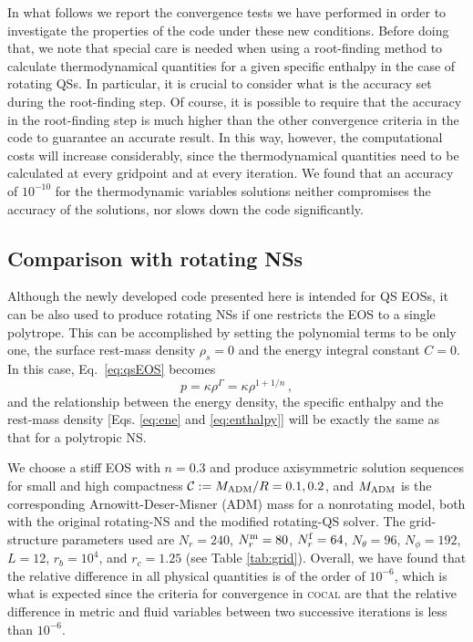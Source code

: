 \documentclass[twocolumn,superscriptaddress,showpacs,prd,aps,amsmath,amssymb,nofootinbib]{revtex4-1}
\newcommand{\cocal}{\textsc{cocal}}
\begin{document}
In what follows we report the convergence tests we have performed in
order to investigate the properties of the code under these new
conditions. Before doing that, we note that special care is needed when
using a root-finding method to calculate thermodynamical quantities for a
given specific enthalpy in the case of rotating QSs. In particular, it is
crucial to consider what is the accuracy set during the root-finding
step. Of course, it is possible to require that the accuracy in the
root-finding step is much higher than the other convergence criteria in
the code to guarantee an accurate result. In this way, however, the
computational costs will increase considerably, since the thermodynamical
quantities need to be calculated at every gridpoint and at every
iteration. We found that an accuracy of $10^{-10}$ for the thermodynamic
variables solutions neither compromises the accuracy of the solutions,
nor slows down the code significantly.



\subsection{Comparison with rotating NSs}

Although the newly developed code presented here is intended for QS EOSs,
it can be also used to produce rotating NSs if one restricts the EOS to a
single polytrope. This can be accomplished by setting the polynomial
terms to be only one, the surface rest-mass density $\rho_s=0$ and the
energy integral constant $C=0$. In this case,
Eq.~\eqref{eq:qsEOS} becomes
%
\begin{equation}
p=\kappa\rho^\Gamma=\kappa\rho^{1+1/n}\,,
\end{equation}
%
and the relationship between the energy density, the specific enthalpy
and the rest-mass density [Eqs. \eqref{eq:ene} and \ref{eq:enthalpy}]
will be exactly the same as that for a polytropic NS.

We choose a stiff EOS with $n=0.3$ and produce axisymmetric solution
sequences for small and high compactness $\mathcal{C}:=M_{\rm ADM}/R=0.1,
0.2$, and $M_{\rm ADM}$ is the corresponding Arnowitt-Deser-Misner (ADM)
mass for a nonrotating model, both with the original rotating-NS and the
modified rotating-QS solver. The grid-structure parameters
used are $N_r=240$, ${N_r^{\rm m}}=80$, ${N_r^{\rm f}}=64$, $N_\theta=96$, $N_\phi=192$,
$L=12$, $r_b=10^4$, and $r_c=1.25$ (see Table \ref{tab:grid}). Overall,
we have found that the relative difference in all physical quantities is
of the order of $10^{-6}$, which is what is expected since the criteria
for convergence in \cocal{} are that the relative difference in metric
and fluid variables between two successive iterations is less than
$10^{-6}$.
\end{document}
